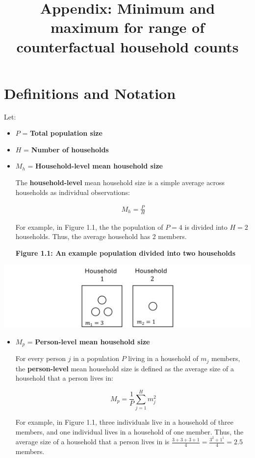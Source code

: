 \documentclass[
]{article}
\title{Appendix: Minimum and maximum for range of counterfactual
household counts}
\author{}
\date{\vspace{-2.5em}}
\begin{document}
\maketitle

\hypertarget{definitions-and-notation}{%
\section{Definitions and Notation}\label{definitions-and-notation}}

Let:

\begin{itemize}
\item
  \(P\) = \textbf{Total population size}
\item
  \(H\) = \textbf{Number of households}
\item
  \(M_h\) = \textbf{Household-level mean household size}

  The \textbf{household-level} mean household size is a simple average
  across households as individual observations:

  \begin{align}
    \label{eq:1}
    \tag{1}
    M_h = \frac{P}{H}
    \end{align}

  For example, in Figure 1.1, the the population of \(P = 4\) is divided
  into \(H = 2\) households. Thus, the average household has 2 members.

  \textbf{Figure 1.1: An example population divided into two households}
\end{itemize}

\includegraphics[width=1\linewidth]{proof_files/figure1-1}

\begin{itemize}
\item
  \(M_p\) = \textbf{Person-level mean household size}

  For every person \(j\) in a population \(P\) living in a household of
  \(m_j\) members, the \textbf{person-level} mean household size is
  defined as the average size of a household that a person lives in:

  \begin{equation}
    \label{eq:2}
    \tag{2}
    M_p = \frac{1}{P} \sum_{j = 1}^H m_j^2
    \end{equation}

  For example, in Figure 1.1, three individuals live in a household of
  three members, and one individual lives in a household of one member.
  Thus, the average size of a household that a person lives in is
  \(\frac{3 + 3 + 3 + 1}{4} = \frac{3^2 + 1^1}{4} = 2.5\) members.
\end{itemize}
\end{document}
